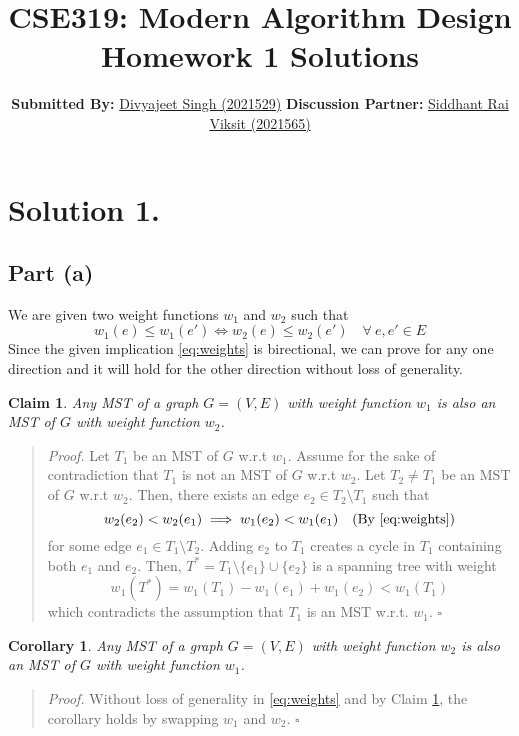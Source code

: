 \documentclass[9pt]{article}
\title{
    \textbf{CSE319: Modern Algorithm Design} \\
    \textbf{\large{Homework 1 Solutions}}
}
\author{
    \textbf{Submitted By:} \href{mailto:divyajeet21529@iiitd.ac.in}{Divyajeet Singh (2021529)}
    \hfill
    \textbf{Discussion Partner:} \href{mailto:siddhant21565@iiitd.ac.in}{Siddhant Rai Viksit (2021565)}
}
\date{}
\newtheorem{claim}{Claim}
\newtheorem{corollary}{Corollary}
\begin{document}
\maketitle

\section*{Solution 1.}
\subsection*{Part (a)}
We are given two weight functions $w_{1}$ and $w_{2}$ such that
\begin{equation}
    \label{eq:weights}
    w_{1}(e) \leq w_{1}(e') \iff w_{2}(e) \leq w_{2}(e') \quad \forall \ e, e' \in E
\end{equation}
Since the given implication \ref{eq:weights} is birectional, we can prove for any one
direction and it will hold for the other direction without loss of generality.
\begin{claim}
    \label{claim:weights-MST}
    Any MST of a graph $G = (V, E)$ with weight function $w_{1}$ is also an MST of $G$ with
    weight function $w_{2}$.
\end{claim}
\begin{quote}
\textit{Proof.}
Let $T_{1}$ be an MST of $G$ w.r.t $w_{1}$. Assume for the sake of contradiction that $T_{1}$
is not an MST of $G$ w.r.t $w_{2}$. Let $T_{2} \neq T_{1}$ be an MST of $G$ w.r.t $w_{2}$.
Then, there exists an edge $e_{2} \in T_{2} \setminus T_{1}$ such that
\begin{equation}
    \label{eq:weights-w2}
    w_{2}(e_{2}) < w_{2}(e_{1}) \implies w_{1}(e_{2}) < w_{1}(e_{1}) \quad (\text{By }\ref{eq:weights})
\end{equation}
for some edge $e_{1} \in T_{1} \setminus T_{2}$. Adding $e_{2}$ to $T_{1}$ creates a cycle
in $T_{1}$ containing both $e_{1}$ and $e_{2}$. Then, $T^{*} = T_{1} \setminus \{e_{1}\} \cup \{e_{2}\}$ is a spanning tree with
weight
\begin{equation}
    \label{eq:weights-Tstar}
    w_{1}(T^{*}) = w_{1}(T_{1}) - w_{1}(e_{1}) + w_{1}(e_{2}) < w_{1}(T_{1})
\end{equation}
which contradicts the assumption that $T_{1}$ is an MST w.r.t. $w_{1}$.
\hfill $\square$
\end{quote}

\begin{corollary}
    Any MST of a graph $G = (V, E)$ with weight function $w_{2}$ is also an MST of $G$ with
    weight function $w_{1}$.
\end{corollary}
\begin{quote}
\textit{Proof.}
    Without loss of generality in \ref{eq:weights} and by Claim \ref{claim:weights-MST},
    the corollary holds by swapping $w_{1}$ and $w_{2}$.
\hfill $\square$
\end{quote}
\end{document}
